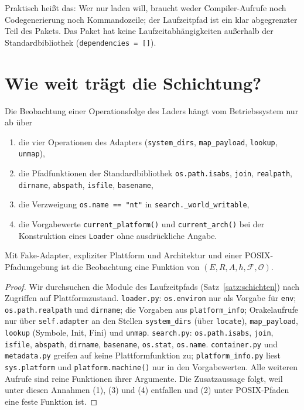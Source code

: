 Praktisch heißt das: Wer nur laden will, braucht weder Compiler-Aufrufe noch Codegenerierung noch Kommandozeile; der Laufzeitpfad ist ein klar abgegrenzter Teil des Pakets. Das Paket hat keine Laufzeitabhängigkeiten außerhalb der Standardbibliothek (\texttt{dependencies = []}).

\section{Wie weit trägt die Schichtung?}

\begin{satz}
	\label{satz:parametrisch}
	Die Beobachtung einer Operationsfolge des Laders hängt vom Betriebssystem nur ab über
	\begin{enumerate}[label=(\arabic*)]
		\item die vier Operationen des Adapters (\texttt{system\_dirs}, \texttt{map\_payload}, \texttt{lookup}, \texttt{unmap}),
		\item die Pfadfunktionen der Standardbibliothek \texttt{os.path.isabs}, \texttt{join}, \texttt{realpath}, \texttt{dirname}, \texttt{abspath}, \texttt{isfile}, \texttt{basename},
		\item die Verzweigung \texttt{os.name == "nt"} in \texttt{search.\_world\_writable},
		\item die Vorgabewerte \texttt{current\_platform()} und \texttt{current\_arch()} bei der Konstruktion eines \texttt{Loader} ohne ausdrückliche Angabe.
	\end{enumerate}
	Mit Fake-Adapter, expliziter Plattform und Architektur und einer POSIX-Pfadumgebung ist die Beobachtung eine Funktion von $(E,R,A,h,\mathcal{F},\mathcal{O})$.
\end{satz}

\begin{proof}
	Wir durchsuchen die Module des Laufzeitpfads (Satz~\ref{satz:schichten}) nach Zugriffen auf Plattformzustand. \texttt{loader.py}: \texttt{os.environ} nur als Vorgabe für \texttt{env}; \texttt{os.path.realpath} und \texttt{dirname}; die Vorgaben aus \texttt{platform\_info}; Orakelaufrufe nur über \texttt{self.adapter} an den Stellen \texttt{system\_dirs} (über \texttt{locate}), \texttt{map\_payload}, \texttt{lookup} (Symbole, Init, Fini) und \texttt{unmap}. \texttt{search.py}: \texttt{os.path.isabs}, \texttt{join}, \texttt{isfile}, \texttt{abspath}, \texttt{dirname}, \texttt{basename}, \texttt{os.stat}, \texttt{os.name}. \texttt{container.py} und \texttt{metadata.py} greifen auf keine Plattformfunktion zu; \texttt{platform\_info.py} liest \texttt{sys.platform} und \texttt{platform.machine()} nur in den Vorgabewerten. Alle weiteren Aufrufe sind reine Funktionen ihrer Argumente. Die Zusatzaussage folgt, weil unter diesen Annahmen (1), (3) und (4) entfallen und (2) unter POSIX-Pfaden eine feste Funktion ist.
\end{proof}

